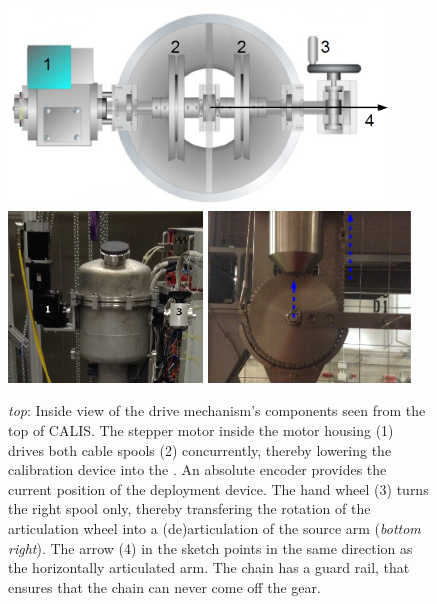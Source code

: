 \begin{figure}[htbp]
 \centering
\includegraphics[width=0.9\textwidth]{Figures/gearDrawing_withNumbers}
  \includegraphics[width=0.46\textwidth]{Figures/CALIS_head.png}
  \includegraphics[width=0.48\textwidth]{Figures/gearArticulated.png}
  \caption{\textit{top}: Inside view of the drive mechanism's components seen from the top of CALIS. The stepper motor inside the motor housing (1) drives both cable spools (2) concurrently, thereby lowering the calibration device into the \lsv. An absolute encoder provides the current position of the deployment device. The hand wheel (3) turns the right spool only, thereby transfering the rotation of the articulation wheel into a (de)articulation of the source arm (\textit{bottom right}). The arrow (4) in the sketch points in the same direction as the horizontally articulated arm. The chain has a guard rail, that ensures that the chain can never come off the gear.}
  \label{fig:sourceArmRotation}
\end{figure} 

